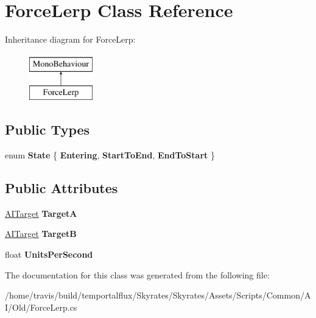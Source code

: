 \hypertarget{class_force_lerp}{\section{Force\-Lerp Class Reference}
\label{class_force_lerp}
}
Inheritance diagram for Force\-Lerp\-:\begin{figure}[H]
\begin{center}
\leavevmode
\includegraphics[height=2.000000cm]{class_force_lerp}
\end{center}
\end{figure}
\subsection*{Public Types}
\begin{DoxyCompactItemize}
\item 
enum {\bfseries State} \{ {\bfseries Entering}, 
{\bfseries Start\-To\-End}, 
{\bfseries End\-To\-Start}
 \}
\end{DoxyCompactItemize}
\subsection*{Public Attributes}
\begin{DoxyCompactItemize}
\item 
\hypertarget{class_force_lerp_a3a49eaf612b0994871f06c0fd0216a8e}{\hyperlink{class_a_i_target}{A\-I\-Target} {\bfseries Target\-A}}\label{class_force_lerp_a3a49eaf612b0994871f06c0fd0216a8e}

\item 
\hypertarget{class_force_lerp_a87dff72a65e7818e3b2349a61acb34bf}{\hyperlink{class_a_i_target}{A\-I\-Target} {\bfseries Target\-B}}\label{class_force_lerp_a87dff72a65e7818e3b2349a61acb34bf}

\item 
\hypertarget{class_force_lerp_acc40eecdc23875d3ca598951a6780845}{float {\bfseries Units\-Per\-Second}}\label{class_force_lerp_acc40eecdc23875d3ca598951a6780845}

\end{DoxyCompactItemize}


The documentation for this class was generated from the following file\-:\begin{DoxyCompactItemize}
\item 
/home/travis/build/temportalflux/\-Skyrates/\-Skyrates/\-Assets/\-Scripts/\-Common/\-A\-I/\-Old/Force\-Lerp.\-cs\end{DoxyCompactItemize}
